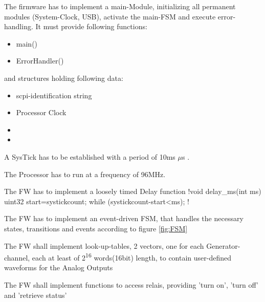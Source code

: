 

	{	The firmware has to implement a main-Module, initializing all permanent modules (System-Clock, USB), activate the main-FSM and execute error-handling. It must provide following functions:
		\begin{itemize} \setlength\itemsep{1px}
		\item main()
		\item ErrorHandler()
		\end{itemize}

		and structures holding following data:
		\begin{itemize} \setlength\itemsep{1px}
		\item scpi-identification string
		\item Processor Clock
		\item 
		\item 
		\end{itemize}

	}




	{	A SysTick has to be established with a period of 10ms $\mu$s .
	}

	{	The Processor has to run at a frequency of 96MHz.
	}

	{	The FW has to implement a loosely timed Delay function 
		\lstC !void delay_ms(int ms){     uint32 start=systickcount;    while (systickcount-start<ms); }!
	}

	{ The FW has to implement an event-driven FSM, that handles the necessary states, transitions and events according to figure \ref{fig:FSM} }

	{ The FW shall implement look-up-tables, 2 vectors, one for each Generator-channel, each at least of 2\textsuperscript{16} words(16bit) length, to contain user-defined waveforms for the Analog Outputs }

	{ The FW shall implement functions to access relais, providing 'turn on', 'turn off' and 'retrieve status' }


